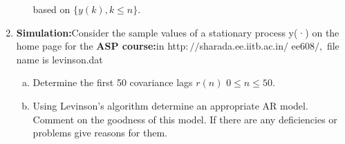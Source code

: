 \documentclass[journal,12pt,twocolumn]{IEEEtran}
\begin{document}
\begin{enumerate}[1.]
\begin{enumerate}[(a)]
based on $\{y(k),k\leq n \}.$
\end{enumerate}
\item \textbf{Simulation:}Consider the sample values of a stationary process y(·) on the home page for the
 \textbf{ASP course:}in http$://$sharada.ee.iitb.ac.in$/$ ee608$/,$ file name is levinson.dat
\begin{enumerate}[(a)]
\item Determine the first 50 covariance lags $r(n)$   ${0}\leq {n} \leq {50}.$
\item Using Levinson's algorithm determine an appropriate AR model. Comment on the goodness
of this model. If there are any deficiencies or problems give reasons for them.
\end{enumerate}
\end{enumerate}
\section{}
\end{document}
